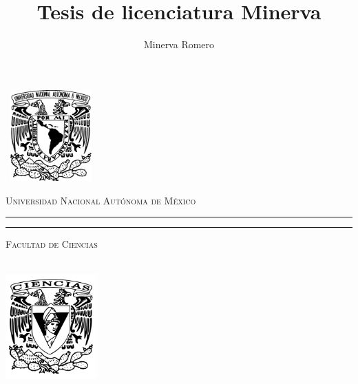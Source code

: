 \documentclass[letterpaper,12pt,oneside]{book}
\title{Tesis de licenciatura Minerva}
\author{Minerva Romero}
\begin{document}
\frontmatter


\begin{titlepage}
    \thispagestyle{empty}
    \begin{minipage}[c][0.17\textheight][c]{0.25\textwidth}
        \begin{center}
            \includegraphics[width=3.5cm, height=3.5cm]{Escudo-UNAM.pdf}
        \end{center}
    \end{minipage}
    \begin{minipage}[c][0.195\textheight][t]{0.75\textwidth}
        \begin{center}
            \vspace{0.3cm}
            \textsc{\large Universidad Nacional Aut\'onoma de M\'exico}\\[0.5cm]
            \vspace{0.3cm}
            \hrule height2.5pt
            \vspace{.2cm}
            \hrule height1pt
            \vspace{.8cm}
            \textsc{Facultad de Ciencias}\\[0.5cm] %
        \end{center}
    \end{minipage}

    \begin{minipage}[c][0.81\textheight][t]{0.25\textwidth}
        \vspace*{5mm}
        \begin{center}
            \hskip2.0mm
            \vrule width1pt height13cm 
            \vspace{5mm}
            \hskip2pt
            \vrule width2.5pt height13cm
            \hskip2mm
            \vrule width1pt height13cm \\
            \vspace{5mm}
            \includegraphics[height=4.0cm]{Escudo-FCIENCIAS.pdf}
        \end{center}
    \end{minipage}
    \begin{minipage}[c][0.81\textheight][t]{0.75\textwidth}
        \begin{center}
            \vspace{1cm}


\end{center}
\end{minipage}
\end{titlepage}
\end{document}
